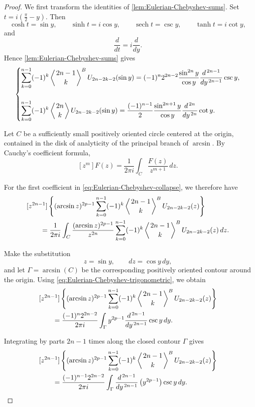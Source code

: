 \documentclass[11pt,twoside]{article}
\numberwithin{equation}{section}
\begin{document}
\begin{proof}
We first transform the identities of
\cref{lem:Eulerian-Chebyshev-sums}.
Set \(\displaystyle
t=i\left(\frac{\pi}{2}-y\right).\)
Then
\[
\cosh t=\sin y,
\qquad
\sinh t=i\cos y,
\qquad
\operatorname{sech}t=\csc y,
\qquad
\tanh t=i\cot y,
\]
and
\[
\frac{d}{dt}=i\frac{d}{dy}.
\]
Hence \cref{lem:Eulerian-Chebyshev-sums} gives
\begin{equation}\label{eq:Eulerian-Chebyshev-trigonometric}
\begin{dcases}
\displaystyle
\sum_{k=0}^{n-1}
(-1)^k
\left\langle {2n-1\atop k}\right\rangle^{B}
U_{2n-2k-2}(\sin y)
=
(-1)^n2^{2n-2}
\frac{\sin^{2n}y}{\cos y}
\frac{d^{\,2n-1}}{dy^{\,2n-1}}\csc y,
\\[3ex]
\displaystyle
\sum_{k=0}^{n-1}
(-1)^k
\left\langle {2n\atop k}\right\rangle
U_{2n-2k-2}(\sin y)
=
\frac{(-1)^{n-1}}{2}
\frac{\sin^{2n+1}y}{\cos y}
\frac{d^{\,2n}}{dy^{\,2n}}\cot y.
\end{dcases}
\end{equation}

Let $C$ be a sufficiently small positively oriented circle
centered at the origin, contained in the disk of analyticity of
the principal branch of $\arcsin$. By Cauchy's coefficient formula,
\[
[z^m]F(z)
=
\frac{1}{2\pi i}
\int_C
\frac{F(z)}{z^{m+1}}\,dz.
\]

For the first coefficient in
\cref{eq:Eulerian-Chebyshev-collapse}, we therefore have
\begin{align*}
&[z^{2n-1}]\left\{
(\arcsin z)^{2p-1}
\sum_{k=0}^{n-1}
(-1)^k
\left\langle {2n-1\atop k}\right\rangle^{B}
U_{2n-2k-2}(z)\right\}
\\
&\qquad=
\frac{1}{2\pi i}
\int_C
\frac{(\arcsin z)^{2p-1}}{z^{2n}}
\sum_{k=0}^{n-1}
(-1)^k
\left\langle {2n-1\atop k}\right\rangle^{B}
U_{2n-2k-2}(z)\,dz.
\end{align*}

Make the substitution
\[
z=\sin y,
\qquad
dz=\cos y\,dy,
\]
and let $\Gamma=\arcsin(C)$ be the corresponding positively
oriented contour around the origin. Using
\cref{eq:Eulerian-Chebyshev-trigonometric}, we obtain
\begin{align*}
&[z^{2n-1}]\left\{
(\arcsin z)^{2p-1}
\sum_{k=0}^{n-1}
(-1)^k
\left\langle {2n-1\atop k}\right\rangle^{B}
U_{2n-2k-2}(z)\right\}
\\
&\qquad=
\frac{(-1)^n2^{2n-2}}{2\pi i}
\int_{\Gamma}
y^{2p-1}
\frac{d^{\,2n-1}}{dy^{\,2n-1}}\csc y\,dy.
\end{align*}

Integrating by parts $2n-1$ times along the closed contour
$\Gamma$ gives
\begin{align}
&[z^{2n-1}]\left\{
(\arcsin z)^{2p-1}
\sum_{k=0}^{n-1}
(-1)^k
\left\langle {2n-1\atop k}\right\rangle^{B}
U_{2n-2k-2}(z)\right\}
\nonumber\\
&\qquad=
\frac{(-1)^{n-1}2^{2n-2}}{2\pi i}
\int_{\Gamma}
\frac{d^{\,2n-1}}{dy^{\,2n-1}}
\left(y^{2p-1}\right)
\csc y\,dy.
\label{eq:collapse-B-Cauchy}
\end{align}


\end{proof}
\end{document}
